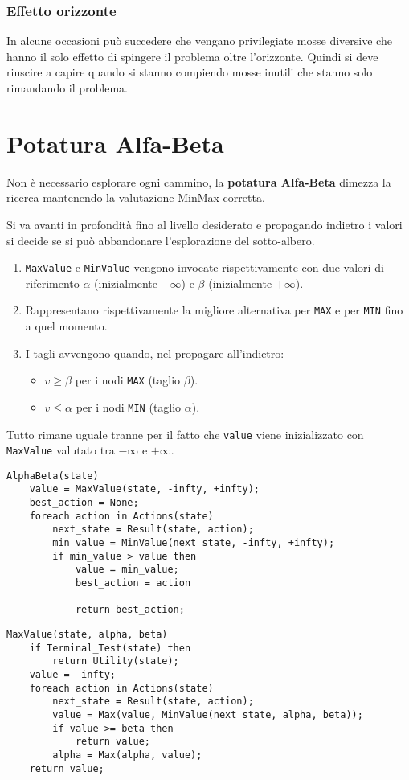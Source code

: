 \subsubsection{Effetto orizzonte}
In alcune occasioni pu\`o succedere che vengano privilegiate mosse diversive che hanno il solo effetto di spingere il
problema oltre l'orizzonte. Quindi si deve riuscire a capire quando si stanno compiendo mosse inutili che stanno solo
rimandando il problema.

\section{Potatura Alfa-Beta}
Non \`e necessario esplorare ogni cammino, la \textbf{potatura Alfa-Beta} dimezza la ricerca mantenendo la valutazione
MinMax corretta.

Si va avanti in profondit\`a fino al livello desiderato e propagando indietro i valori si
decide se si pu\`o abbandonare l'esplorazione del sotto-albero.
\begin{enumerate}
	\item \verb|MaxValue| e \verb|MinValue| vengono invocate rispettivamente con due valori di riferimento $\alpha$
	      (inizialmente $-\infty$) e $\beta$ (inizialmente $+\infty$).
	\item Rappresentano rispettivamente la migliore alternativa per \verb|MAX| e per \verb|MIN| fino a quel momento.
	\item I tagli avvengono quando, nel propagare all'indietro:
	      \begin{itemize}
		      \item $v \geq \beta$ per i nodi \verb|MAX| (taglio $\beta$).
		      \item $v \leq \alpha$ per i nodi \verb|MIN| (taglio $\alpha$).
	      \end{itemize}
\end{enumerate}
Tutto rimane uguale tranne per il fatto che \verb|value| viene inizializzato con \verb|MaxValue| valutato
tra $-\infty$ e $+\infty$.
\begin{lstlisting}[style=pseudo-style]
AlphaBeta(state)
	value = MaxValue(state, -infty, +infty);
	best_action = None;
	foreach action in Actions(state)
		next_state = Result(state, action);
		min_value = MinValue(next_state, -infty, +infty);
		if min_value > value then
			value = min_value;
			best_action = action
	
			return best_action;
\end{lstlisting}
\begin{lstlisting}[style=pseudo-style]
MaxValue(state, alpha, beta)
	if Terminal_Test(state) then
		return Utility(state);
	value = -infty;
	foreach action in Actions(state)
		next_state = Result(state, action);
		value = Max(value, MinValue(next_state, alpha, beta));
		if value >= beta then
			return value;
		alpha = Max(alpha, value);
	return value;
\end{lstlisting}

